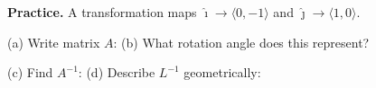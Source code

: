 \documentclass[10pt]{article}
\begin{document}
\vspace{0.06in}

\begin{practicebox}
\small
\textbf{Practice.} A transformation maps $\hat{\imath} \to \langle0,-1\rangle$ and $\hat{\jmath} \to \langle1,0\rangle$.

(a) Write matrix $A$: \blank{3cm} \qquad
(b) What rotation angle does this represent? \blank{2.5cm}

(c) Find $A^{-1}$: \blank{3cm} \qquad
(d) Describe $L^{-1}$ geometrically: \blank{5cm}
\end{practicebox}
\end{document}
